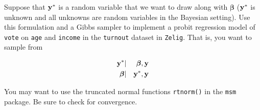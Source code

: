 \documentclass[10pt,a4paper]{article}
\begin{document}
\begin{enumerate}
Suppose that $\bf{y}^*$ is a random variable that we want to draw along with $\bm{\beta}$ ($\bf{y}^*$ is unknown and all unknowns are random variables in the Bayesian setting).  Use this formulation and a Gibbs sampler to implement a probit regression model of {\tt vote} on {\tt age} and {\tt income} in the {\tt turnout} dataset in {\tt Zelig}.  That is, you want to sample from

\begin{eqnarray*}
\bf{y^*} &|& \bm{\beta}, \bf{y} \\
\bm{\beta} &|& \bf{y^*}, \bf{y}
\end{eqnarray*}

You may want to use the truncated normal functions {\tt rtnorm()} in the {\tt msm} package.  Be sure to check for convergence.
\end{enumerate}
\end{document}
